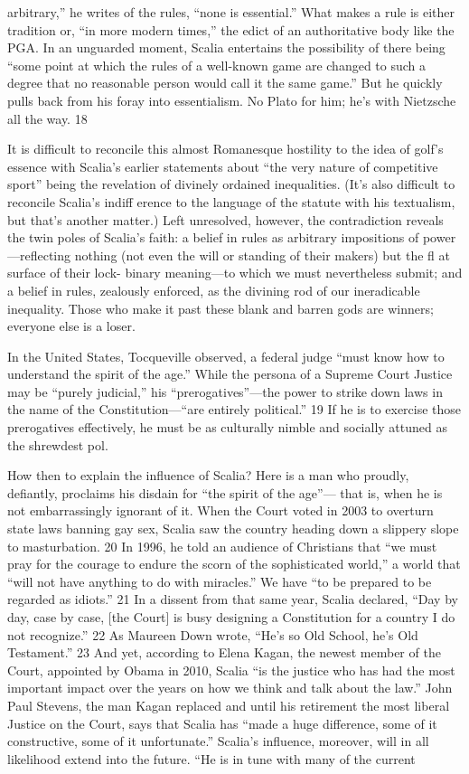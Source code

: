 arbitrary,” he writes of the rules, “none is essential.” What makes a rule is either tradition or, “in more modern times,” the edict of an authoritative body like the PGA. In an unguarded moment, Scalia entertains the possibility of there being “some point at which the rules of a well-known game are changed to such a degree that no reasonable person would call it the same game.” But he quickly pulls back from his foray into essentialism. No Plato for him; he’s with Nietzsche all the way. {\color{blue} 18 } {\par} It is difficult to reconcile this almost Romanesque hostility to the idea of golf's essence with Scalia’s earlier statements about “the very nature of competitive sport” being the revelation of divinely ordained inequalities. (It’s also difficult to reconcile Scalia’s indiff erence to the language of the statute with his textualism, but that’s another matter.) Left unresolved, however, the contradiction reveals the twin poles of Scalia’s faith: a belief in rules as arbitrary impositions of power—reflecting nothing (not even the will or standing of their makers) but the fl at surface of their lock- binary meaning—to which we must nevertheless submit; and a belief in rules, zealously enforced, as the divining rod of our ineradicable inequality. Those who make it past these blank and barren gods are winners; everyone else is a loser.{\par} In the United States, Tocqueville observed, a federal judge “must know how to understand the spirit of the age.” While the persona of a Supreme Court Justice may be “purely judicial,” his “prerogatives”—the power to strike down laws in the name of the Constitution—“are entirely political.” {\color{blue} 19 } If he is to exercise those prerogatives effectively, he must be as culturally nimble and socially attuned as the shrewdest pol.{\par} How then to explain the influence of Scalia? Here is a man who proudly, defiantly, proclaims his disdain for “the spirit of the age”— that is, when he is not embarrassingly ignorant of it. When the Court voted in 2003 to overturn state laws banning gay sex, Scalia saw the country heading down a slippery slope to masturbation. {\color{blue} 20 } In 1996, he told an audience of Christians that “we must pray for the courage to endure the scorn of the sophisticated world,” a world that “will not have anything to do with miracles.” We have “to be prepared to be regarded as idiots.” {\color{blue} 21 } In a dissent from that same year, Scalia declared, “Day by day, case by case, [the Court] is busy designing a Constitution for a country I do not recognize.” {\color{blue} 22 } As Maureen Down wrote, “He’s so Old School, he’s Old Testament.” {\color{blue} 23 } And yet, according to Elena Kagan, the newest member of the Court, appointed by Obama in 2010, Scalia “is the justice who has had the most important impact over the years on how we think and talk about the law.” John Paul Stevens, the man Kagan replaced and until his retirement the most liberal Justice on the Court, says that Scalia has “made a huge difference, some of it constructive, some of it unfortunate.” Scalia’s influence, moreover, will in all likelihood extend into the future. “He is in tune with many of the current 